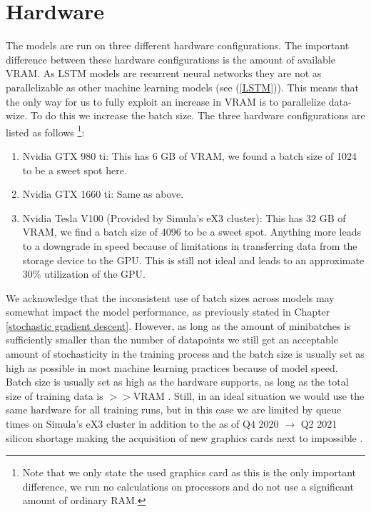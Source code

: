 \section{Hardware}
The models are run on three different hardware configurations. The important difference 
between these hardware configurations is the amount of available VRAM. As LSTM models 
are recurrent neural networks they are not as parallelizable as other machine learning 
models (see (\ref{LSTM})). This means that the only way for us to fully exploit 
an increase in VRAM is to parallelize data-wize. To do this we increase the batch size.
The three hardware configurations are listed as follows \footnote{Note that we only 
state the used graphics card as this is the only important difference, we run no 
calculations on processors and do not use a significant amount of ordinary RAM.}:
\begin{enumerate}
    \item Nvidia GTX 980 ti: This has 6 GB of VRAM, we found a batch size of 1024 
        to be a sweet spot here.
    \item Nvidia GTX 1660 ti: Same as above.
    \item Nvidia Tesla V100 (Provided by Simula's eX3 cluster): This has 32 GB of VRAM, we find a batch size of 4096 
        to be a sweet spot. Anything more leads to a downgrade in speed because 
        of limitations in transferring data from the storage device to the GPU. 
        This is still not ideal and leads to an approximate 30\% utilization of the 
        GPU.
\end{enumerate}
We acknowledge that the inconsistent use of batch sizes across models may somewhat 
impact the model performance, as previously stated in Chapter \ref{stochastic gradient descent}.
However, as long as the amount of minibatches is sufficiently smaller than the number of datapoints we 
still get an acceptable amount of stochasticity in the training process and the batch 
size is usually set as high as possible in most machine learning practices because 
of model speed. Batch size is usually set as high as the hardware supports, as long 
as the total size of training data is $>>$VRAM \citationneeded.
Still, in an ideal situation we would use the same hardware for all training runs, 
but in this case we are limited by queue times on Simula's eX3 cluster in addition 
to the as of Q4 2020 $\rightarrow$ Q2 2021 silicon shortage making the acquisition of 
new graphics cards next to impossible \citep{GPUShortage}.
